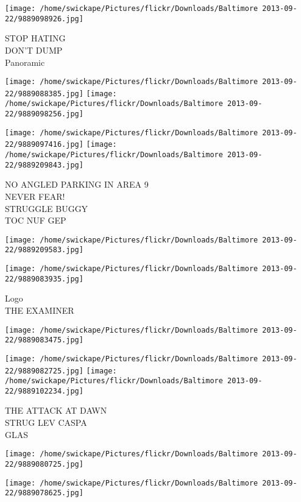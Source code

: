 \documentclass[10pt,letterpaper]{article}
\begin{document}
\vspace{0.25in}
\texttt{[image: /home/swickape/Pictures/flickr/Downloads/Baltimore 2013-09-22/9889098926.jpg]}

STOP HATING\\
DON'T DUMP\\
Panoramic
\pagebreak

\texttt{[image: /home/swickape/Pictures/flickr/Downloads/Baltimore 2013-09-22/9889088385.jpg]}
\texttt{[image: /home/swickape/Pictures/flickr/Downloads/Baltimore 2013-09-22/9889098256.jpg]}

\texttt{[image: /home/swickape/Pictures/flickr/Downloads/Baltimore 2013-09-22/9889097416.jpg]}
\texttt{[image: /home/swickape/Pictures/flickr/Downloads/Baltimore 2013-09-22/9889209843.jpg]}

NO ANGLED PARKING IN AREA 9\\
NEVER FEAR!\\
STRUGGLE BUGGY\\
TOC NUF GEP
\pagebreak

\texttt{[image: /home/swickape/Pictures/flickr/Downloads/Baltimore 2013-09-22/9889209583.jpg]}

\vspace{0.25in}
\texttt{[image: /home/swickape/Pictures/flickr/Downloads/Baltimore 2013-09-22/9889083935.jpg]}

Logo\\
THE EXAMINER
\pagebreak

\texttt{[image: /home/swickape/Pictures/flickr/Downloads/Baltimore 2013-09-22/9889083475.jpg]}

\vspace{0.25in}
\texttt{[image: /home/swickape/Pictures/flickr/Downloads/Baltimore 2013-09-22/9889082725.jpg]}
\texttt{[image: /home/swickape/Pictures/flickr/Downloads/Baltimore 2013-09-22/9889102234.jpg]}

THE ATTACK AT DAWN\\
STRUG LEV CASPA\\
GLAS
\pagebreak

\texttt{[image: /home/swickape/Pictures/flickr/Downloads/Baltimore 2013-09-22/9889080725.jpg]}

\vspace{0.25in}
\texttt{[image: /home/swickape/Pictures/flickr/Downloads/Baltimore 2013-09-22/9889078625.jpg]}
\end{document}
